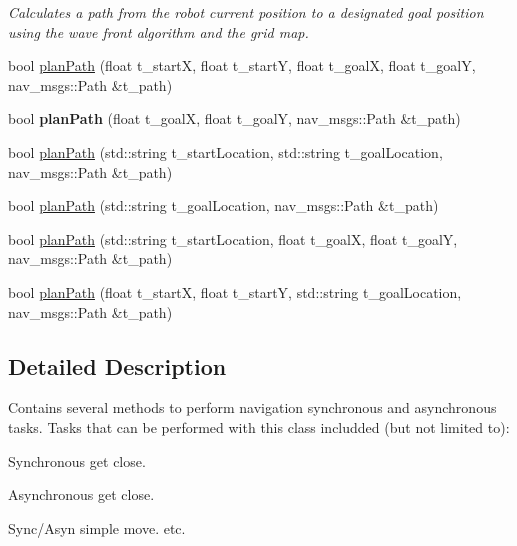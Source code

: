 \begin{DoxyCompactItemize}
\begin{DoxyCompactList}\small\item\em Calculates a path from the robot current position to a designated goal position using the wave front algorithm and the grid map. \end{DoxyCompactList}\item 
bool \hyperlink{class_navigation_tasks_a77b9255d48f9339897a2f15c4096d1cd}{plan\+Path} (float t\+\_\+startX, float t\+\_\+startY, float t\+\_\+goalX, float t\+\_\+goalY, nav\+\_\+msgs\+::\+Path \&t\+\_\+path)
\item 
bool {\bfseries plan\+Path} (float t\+\_\+goalX, float t\+\_\+goalY, nav\+\_\+msgs\+::\+Path \&t\+\_\+path)\hypertarget{class_navigation_tasks_a9a3491dbd67affb917ec1ff74715aa08}{}\label{class_navigation_tasks_a9a3491dbd67affb917ec1ff74715aa08}

\item 
bool \hyperlink{class_navigation_tasks_afe0fa9a2252e1e09e3cb4ed4cbcffb4b}{plan\+Path} (std\+::string t\+\_\+start\+Location, std\+::string t\+\_\+goal\+Location, nav\+\_\+msgs\+::\+Path \&t\+\_\+path)
\item 
bool \hyperlink{class_navigation_tasks_a189a12aaea680fc3d91d26da00f64c1e}{plan\+Path} (std\+::string t\+\_\+goal\+Location, nav\+\_\+msgs\+::\+Path \&t\+\_\+path)
\item 
bool \hyperlink{class_navigation_tasks_af3a0164d20a4f0e964d0b5cac912f1f5}{plan\+Path} (std\+::string t\+\_\+start\+Location, float t\+\_\+goalX, float t\+\_\+goalY, nav\+\_\+msgs\+::\+Path \&t\+\_\+path)
\item 
bool \hyperlink{class_navigation_tasks_ae5e0999b8d7ae0a497e496ccb71badef}{plan\+Path} (float t\+\_\+startX, float t\+\_\+startY, std\+::string t\+\_\+goal\+Location, nav\+\_\+msgs\+::\+Path \&t\+\_\+path)
\end{DoxyCompactItemize}


\subsection{Detailed Description}
Contains several methods to perform navigation synchronous and asynchronous tasks. Tasks that can be performed with this class includded (but not limited to)\+: 


\begin{DoxyItemize}
\item Synchronous get close.
\item Asynchronous get close.
\item Sync/\+Asyn simple move. etc.
\end{DoxyItemize}


